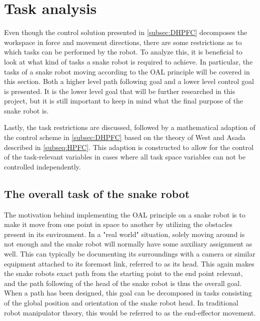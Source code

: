 



\section{Task analysis}

Even though the control solution presented in \ref{subsec:DHPFC} decomposes the workspace in force and movement directions, there are some restrictions as to which tasks can be performed by the robot. To analyze this, it is beneficial to look at what kind of tasks a snake robot is required to achieve. In particular, the tasks of a snake robot moving according to the OAL principle will be covered in this section. Both a higher level path following goal and a lower level control goal is presented. It is the lower level goal that will be further researched in this project, but it is still important to keep in mind what the final purpose of the snake robot is.

Lastly, the task restrictions are discussed, followed by a mathematical adaption of the control scheme in \ref{subsec:DHPFC} based on the theory of West and Asada \cite{west1985method} described in \ref{subseq:HPFC}. This adaption is constructed to allow for the control of the task-relevant variables in cases where all task space variables can not be controlled independently.

\subsection{The overall task of the snake robot}

The motivation behind implementing the OAL principle on a snake robot is to make it move from one point in space to another by utilizing the obstacles present in its environment. In a "real world" situation, solely moving around is not enough and the snake robot will normally have some auxiliary assignment as well. This can typically be documenting its surroundings with a camera or similar equipment attached to its foremost link, referred to as its head. This again makes the snake robots exact path from the starting point to the end point relevant, and the path following of the head of the snake robot is thus the overall goal. When a path has been designed, this goal can be decomposed in tasks consisting of the global position and orientation of the snake robot head. In traditional robot manipulator theory, this would be referred to as the end-effector movement. 


